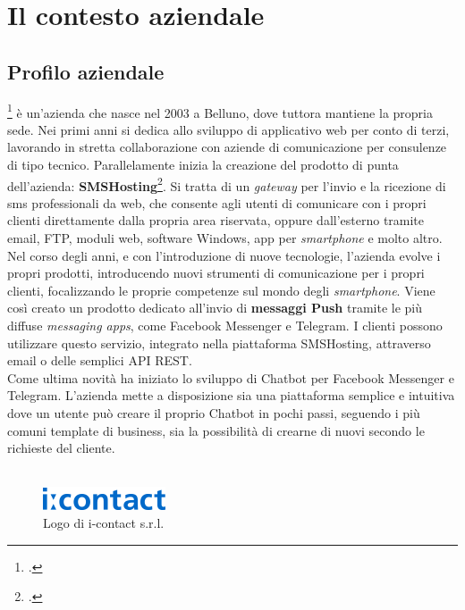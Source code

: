 
\chapter{Il contesto aziendale}
\label{cap:contesto-aziendale}

\section{Profilo aziendale}
\azienda\footcite{icontact} è un'azienda che nasce nel 2003 a Belluno, dove tuttora mantiene la propria sede. Nei primi anni si dedica allo sviluppo di applicativo web per conto di terzi, lavorando in stretta collaborazione con aziende di comunicazione per consulenze di tipo tecnico. Parallelamente inizia la creazione del prodotto di punta dell'azienda: \textbf{SMSHosting}\footcite{smshosting}. Si tratta di un \emph{gateway} per l'invio e la ricezione di sms professionali da web, che consente agli utenti di comunicare con i propri clienti direttamente dalla propria area riservata, oppure dall'esterno tramite email, \gls{FTP}, moduli web, software Windows, app per \emph{smartphone} e molto altro.  \\
Nel corso degli anni, e con l'introduzione di nuove tecnologie, l'azienda evolve i propri prodotti, introducendo nuovi strumenti di comunicazione per i propri clienti, focalizzando le proprie competenze sul mondo degli \emph{smartphone}.
Viene così creato un prodotto dedicato all'invio di \textbf{messaggi \gls{Push}} tramite le più diffuse \emph{messaging apps}, come Facebook Messenger e Telegram. I clienti possono utilizzare questo servizio, integrato nella piattaforma SMSHosting, attraverso email o delle semplici \gls{API} REST.\\
Come ultima novità \azienda{} ha iniziato lo sviluppo di \gls{Chatbot} per Facebook Messenger e Telegram. L'azienda mette a disposizione sia una piattaforma semplice e intuitiva dove un utente può creare il proprio \gls{Chatbot} in pochi passi, seguendo i più comuni template di business, sia la possibilità di crearne di nuovi secondo le richieste del cliente.
\\ \\
\begin{figure}[h]
	\centering
	\includegraphics[scale=1]{../Immagini/logo-icontact.png}
	\caption{Logo di i-contact s.r.l.}
\end{figure}
\newpage
